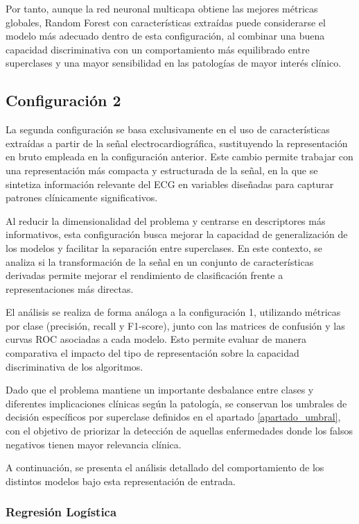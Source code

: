 \documentclass[12pt,a4paper,twoside]{book}
\begin{document}
Por tanto, aunque la red neuronal multicapa obtiene las mejores métricas globales, Random Forest con características extraídas puede considerarse el modelo más adecuado dentro de esta configuración, al combinar una buena capacidad discriminativa con un comportamiento más equilibrado entre superclases y una mayor sensibilidad en las patologías de mayor interés clínico.

\subsection{Configuración 2}

La segunda configuración se basa exclusivamente en el uso de características extraídas a partir de la señal electrocardiográfica, sustituyendo la representación en bruto empleada en la configuración anterior. 
Este cambio permite trabajar con una representación más compacta y estructurada de la señal, en la que se sintetiza información relevante del ECG en variables diseñadas para capturar patrones clínicamente significativos.

Al reducir la dimensionalidad del problema y centrarse en descriptores más informativos, esta configuración busca mejorar la capacidad de generalización de los modelos y facilitar la separación entre superclases. 
En este contexto, se analiza si la transformación de la señal en un conjunto de características derivadas permite mejorar el rendimiento de clasificación frente a representaciones más directas.

El análisis se realiza de forma análoga a la configuración 1, utilizando métricas por clase (precisión, recall y F1-score), junto con las matrices de confusión y las curvas ROC asociadas a cada modelo. 
Esto permite evaluar de manera comparativa el impacto del tipo de representación sobre la capacidad discriminativa de los algoritmos.

Dado que el problema mantiene un importante desbalance entre clases y diferentes implicaciones clínicas según la patología, se conservan los umbrales de decisión específicos por superclase definidos en el apartado \ref{apartado_umbral}, con el objetivo de priorizar la detección de aquellas enfermedades donde los falsos negativos tienen mayor relevancia clínica.

A continuación, se presenta el análisis detallado del comportamiento de los distintos modelos bajo esta representación de entrada.

\subsubsection*{Regresión Logística}
\end{document}
